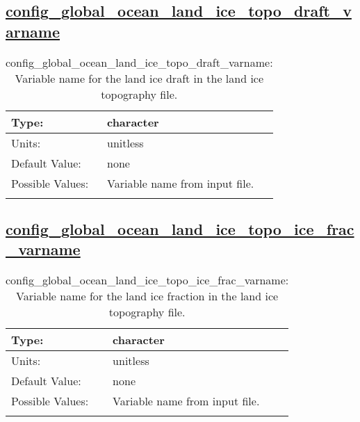 \subsection[config\_global\_ocean\_land\_ice\_topo\_draft\_varname]{\hyperref[sec:nm_tab_global_ocean]{config\_global\_ocean\_land\_ice\_topo\_draft\_varname}}
\label{subsec:nm_sec_config_global_ocean_land_ice_topo_draft_varname}
\begin{center}
\begin{longtable}{| p{2.0in} || p{4.0in} |}
    \hline
    Type: & character \\
    \hline
    Units: & \si{unitless} \\
    \hline
    Default Value: & none \\
    \hline
    Possible Values: & Variable name from input file. \\
    \hline
    \caption{config\_global\_ocean\_land\_ice\_topo\_draft\_varname: Variable name for the land ice draft in the land ice topography file.}
\end{longtable}
\end{center}
\subsection[config\_global\_ocean\_land\_ice\_topo\_ice\_frac\_varname]{\hyperref[sec:nm_tab_global_ocean]{config\_global\_ocean\_land\_ice\_topo\_ice\_frac\_varname}}
\label{subsec:nm_sec_config_global_ocean_land_ice_topo_ice_frac_varname}
\begin{center}
\begin{longtable}{| p{2.0in} || p{4.0in} |}
    \hline
    Type: & character \\
    \hline
    Units: & \si{unitless} \\
    \hline
    Default Value: & none \\
    \hline
    Possible Values: & Variable name from input file. \\
    \hline
    \caption{config\_global\_ocean\_land\_ice\_topo\_ice\_frac\_varname: Variable name for the land ice fraction in the land ice topography file.}
\end{longtable}
\end{center}
